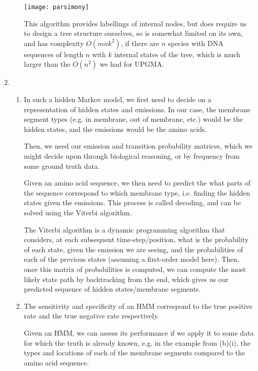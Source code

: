 \begin{enumerate}[label=(\alph*)]
\begin{enumerate}[label=(\roman*)]
        \texttt{[image: parsimony]}

        This algorithm provides labellings of internal nodes, but does require us to design a tree structure ourselves, so is somewhat limited on its own, and has complexity $O(mnk^2)$, if there are $n$ species with DNA sequences of length $n$ with $k$ internal states of the tree, which is much larger than the $O(n^2)$ we had for UPGMA.

    \end{enumerate}

  \item
    \begin{enumerate}[label=(\roman*)]
      \item
        In such a hidden Markov model, we first need to decide on a representation of hidden states and emissions. In our case, the membrane segment types (e.g. in membrane, out of membrane, etc.) would be the hidden states, and the emissions would be the amino acids.

        Then, we need our emission and transition probability matrices, which we might decide upon through biological reasoning, or by frequency from some ground truth data.

        Given an amino acid sequence, we then need to predict the what parts of the sequence correspond to which membrane type, i.e. finding the hidden states given the emissions. This process is called decoding, and can be solved using the Viterbi algorithm.

        The Viterbi algorithm is a dynamic programming algorithm that considers, at each subsequent time-step/position, what is the probability of each state, given the emission we are seeing, and the probabilities of each of the previous states (assuming a first-order model here). Then, once this matrix of probabilities is computed, we can compute the most likely state path by backtracking from the end, which gives us our predicted sequence of hidden states/membrane segments.

      \item
        The sensitivity and specificity of an HMM correspond to the true positive rate and the true negative rate respectively.

        Given an HMM, we can assess its performance if we apply it to some data for which the truth is already known, e.g. in the example from (b)(i), the types and locations of each of the membrane segments compared to the amino acid sequence.


\end{enumerate}
\end{enumerate}
